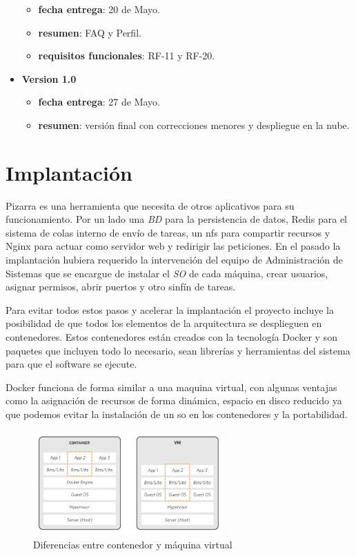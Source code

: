 \documentclass[11pt,spanish,listoffigures,listoftables]{tfgetsinf}
\begin{document}
\begin{itemize}
\begin{itemize}
	\item \textbf{fecha entrega}: 20 de Mayo.
	\item \textbf{resumen}: FAQ y Perfil. 
	\item \textbf{requisitos funcionales}: RF-11 y RF-20.
\end{itemize}
	\item \textbf{Version 1.0}
\begin{itemize}
	\item \textbf{fecha entrega}: 27 de Mayo.
	\item \textbf{resumen}: versión final con correcciones menores y despliegue en la nube.
\end{itemize}	
\end{itemize}

\chapter{Implantación}

Pizarra es una herramienta que necesita de otros aplicativos para su funcionamiento. Por un lado una \textit{BD} para la persistencia de datos, Redis para el sistema de colas interno de envío de tareas, un \acrshort{nfs} para compartir recursos y Nginx para actuar como servidor web y redirigir las peticiones. En el pasado la implantación hubiera requerido la intervención del equipo de Administración de Sistemas que se encargue de instalar el \textit{SO} de cada máquina, crear usuarios, asignar permisos, abrir puertos y otro sinfín de tareas.

Para evitar todos estos pasos y acelerar la implantación el proyecto incluye la posibilidad de que todos los elementos de la arquitectura se desplieguen en \Gls{contenedor}es. Estos \Gls{contenedor}es están creados con la tecnología Docker y son paquetes que incluyen todo lo necesario, sean librerías y herramientas del sistema para que el software se ejecute.

Docker funciona de forma similar a una maquina virtual, con algunas ventajas como la asignación de recursos de forma dinámica, espacio en disco reducido ya que podemos evitar la instalación de un \acrshort{so} en los contenedores y la portabilidad.

\begin{figure}[ht]
	\centering
	\includegraphics[width=0.65\textwidth]{img/container-vs-vm}
	\caption[Diferencias entre contenedor Docker y máquina virtual]{Diferencias entre contenedor y máquina virtual}
	\label{figura:container-vs-vm}
\end{figure}
\end{document}

